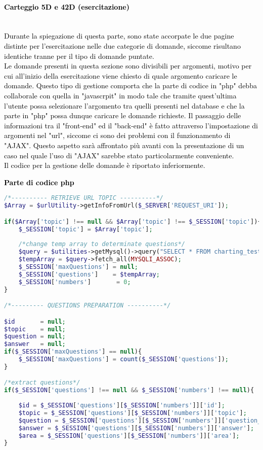 \paragraph{\textcolor{black}{Carteggio 5D e 42D (esercitazione)}}\leavevmode\\
\textcolor{black}{Durante la spiegazione di questa parte, sono state accorpate le due pagine distinte per l'esercitazione nelle due categorie di domande, siccome risultano identiche tranne per il tipo di domande puntate.\\
Le domande presenti in questa sezione sono divisibili per argomenti, motivo per cui all'inizio della esercitazione viene chiesto di quale argomento caricare le domande. Questo tipo di gestione comporta che la parte di codice in "php" debba collaborale con quella in "javascrpit" in modo tale che tramite quest'ultima l'utente possa selezionare l'argomento tra quelli presenti nel database e che la parte in "php" possa dunque caricare le domande richieste. Il passaggio delle informazioni tra il "front-end" ed il "back-end" è fatto attraverso l'impostazione di argomenti nel "url", siccome ci sono dei problemi con il funzionamento di "AJAX". Questo aspetto sarà affrontato più avanti con la presentazione di un caso nel quale l'uso di "AJAX" sarebbe stato particolarmente conveniente.\\
Il codice per la gestione delle domande è riportato inferiormente.}\newline 

\textbf{\textcolor{black}{Parte di codice php}}\\

\begin{lstlisting}[language=php]
/*---------- RETRIEVE URL TOPIC ----------*/
$Array = $urlUtility->getInfoFromUrl($_SERVER['REQUEST_URI']);

if($Array['topic'] !== null && $Array['topic'] !== $_SESSION['topic']){
	$_SESSION['topic'] = $Array['topic'];
	
	/*change temp array to determinate questions*/
	$query = $utilities->getMysql()->query("SELECT * FROM charting_test_5d WHERE (topic = '{$Array['topic']}')");
	$tempArray = $query->fetch_all(MYSQLI_ASSOC);
	$_SESSION['maxQuestions'] = null;
	$_SESSION['questions']    = $tempArray;
	$_SESSION['numbers']       = 0;
}

/*--------- QUESTIONS PREPARATION ----------*/

$id       = null;
$topic    = null;
$question = null;
$answer   = null;
if($_SESSION['maxQuestions'] == null){
	$_SESSION['maxQuestions'] = count($_SESSION['questions']);
}

/*extract questions*/
if($_SESSION['questions'] !== null && $_SESSION['numbers'] !== null){
	
	$id = $_SESSION['questions'][$_SESSION['numbers']]['id'];
	$topic = $_SESSION['questions'][$_SESSION['numbers']]['topic'];
	$question = $_SESSION['questions'][$_SESSION['numbers']]['question_text'];
	$answer = $_SESSION['questions'][$_SESSION['numbers']]['answer'];
	$area = $_SESSION['questions'][$_SESSION['numbers']]['area'];	
}
\end{lstlisting}

